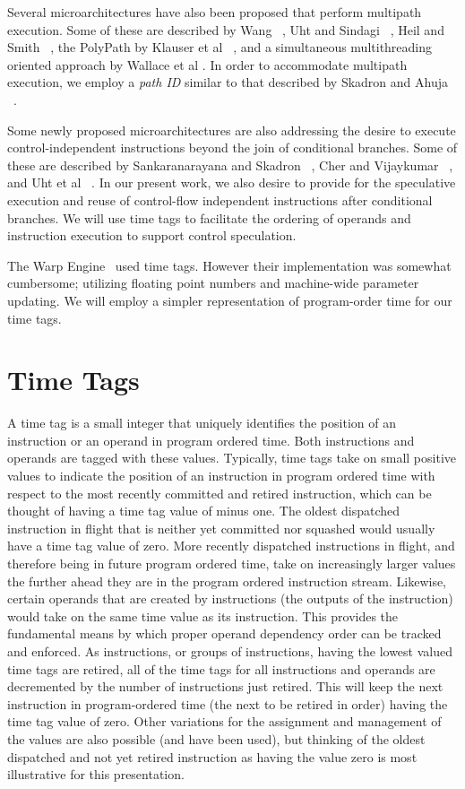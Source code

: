 \documentclass[10pt,twocolumn]{article}
\begin{document}
Several microarchitectures have also been proposed that perform multipath
execution.  Some of these are described by Wang ~\cite{Wang90}, 
Uht and Sindagi ~\cite{Uht95},
Heil and Smith ~\cite{Heil96},
the PolyPath by Klauser et al ~\cite{Klauser98},
and a simultaneous multithreading oriented approach by
Wallace et al \cite{Wallace98}. 
In order to accommodate multipath execution, we 
employ a \textit{path ID} similar to that described by Skadron
and Ahuja ~\cite{Skadron01}.

Some newly proposed microarchitectures are also addressing
the desire to execute control-independent instructions
beyond the join of conditional branches.
Some of these are described by 
Sankaranarayana and Skadron ~\cite{Sank01a,Sank01b}, Cher and
Vijaykumar ~\cite{Cher01}, and Uht et al ~\cite{Uht01}.
In our present work, we also desire to provide for the speculative
execution and reuse of control-flow independent instructions
after conditional branches.  We will use time tags
to facilitate the ordering of operands and instruction execution to
support control speculation.

The Warp Engine~\cite{Cleary95} used time tags.  
However their implementation
was somewhat cumbersome; utilizing 
floating point numbers and machine-wide parameter
updating.  
We will employ a simpler representation of program-order time for our time
tags.
%
%
\section{Time Tags}
%
A time tag is a small
integer that uniquely identifies the position of an instruction
or an operand in program ordered time.
Both instructions and operands are tagged with these values.
Typically, time tags take on small positive values to
indicate the position of an instruction in program ordered
time with respect to the most recently committed and retired
instruction, which can be thought of having a time tag value
of minus one.
The oldest dispatched instruction in flight that is neither 
yet committed nor
squashed would usually have a time tag value of zero.
More recently dispatched instructions in flight, and therefore being
in future program
ordered time, take on increasingly larger values the further ahead
they are in the program ordered instruction stream.
Likewise, certain operands that are created by instructions 
(the outputs of the instruction) would take on
the same time value as its instruction.  
This provides
the fundamental means by which proper operand dependency order can
be tracked and enforced.
As instructions, or groups of instructions,
having the lowest valued time tags
are retired, all of the time tags for all instructions and
operands are decremented by the number of instructions just
retired.  
This will keep the next instruction in program-ordered
time (the next to be retired in order)
having the time tag value of zero.
Other variations for the assignment and management of the
values are also possible (and have been used), but thinking 
of the oldest dispatched
and not yet retired instruction as having the value zero is
most illustrative for this presentation.
\end{document}
